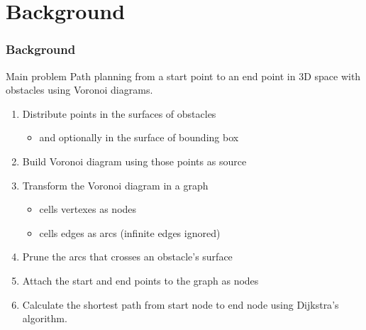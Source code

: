 \section{Background}

\begin{frame}
  \frametitle{Background}
  \begin{block}{Main problem}
    \alert{Path planning} from a \alert{start} point to an \alert{end}
    point in 3D space with obstacles using \alert{Voronoi} diagrams.
  \end{block}\pause
  \begin{enumerate}
  \item Distribute \alert{points} in the surfaces of obstacles
    \begin{itemize}
    \item and optionally in the surface of bounding box\pause
    \end{itemize}
  \item Build \alert{Voronoi} diagram using those points as
    source\pause
  \item Transform the Voronoi diagram in a \alert{graph}
    \begin{itemize}
    \item cells \alert{vertexes} as \alert{nodes}
    \item cells \alert{edges} as \alert{arcs} (infinite edges
      ignored)\pause
    \end{itemize}
  \item \alert{Prune} the arcs that crosses an obstacle's
    surface\pause
  \item Attach the \alert{start} and \alert{end} points to the
    graph as nodes\pause
  \item Calculate the shortest path from start node to end node using
    \alert{Dijkstra}'s algorithm.
  \end{enumerate}
\end{frame}


